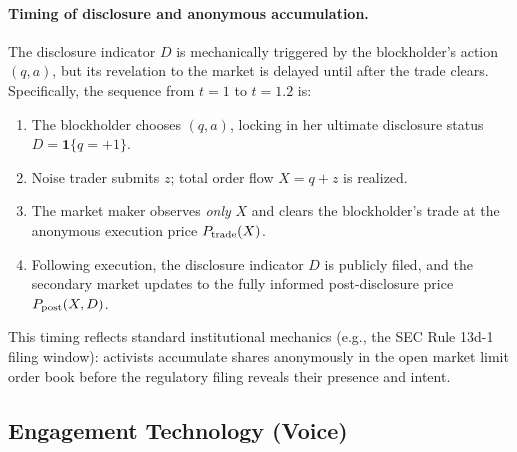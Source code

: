 \documentclass[11pt]{article}
\newcommand{\1}{\mathbf{1}}
\begin{document}
\paragraph{Timing of disclosure and anonymous accumulation.} The disclosure indicator $D$ is mechanically triggered by the blockholder's action $(q, a)$, but its revelation to the market is delayed until after the trade clears. Specifically, the sequence from $t=1$ to $t=1.2$ is:
\begin{enumerate}[label=(\roman*),leftmargin=2em,itemsep=0pt]
\item The blockholder chooses $(q, a)$, locking in her ultimate disclosure status $D = \1\{q=+1\}$.
\item Noise trader submits $z$; total order flow $X = q + z$ is realized.
\item The market maker observes \emph{only} $X$ and clears the blockholder's trade at the anonymous execution price $P_{\textup{trade}}(X)$.
\item Following execution, the disclosure indicator $D$ is publicly filed, and the secondary market updates to the fully informed post-disclosure price $P_{\textup{post}}(X, D)$.
\end{enumerate}
This timing reflects standard institutional mechanics (e.g., the SEC Rule 13d-1 filing window): activists accumulate shares anonymously in the open market limit order book before the regulatory filing reveals their presence and intent.

%
\subsection{Engagement Technology (Voice)}
\label{sec:engagement}
%
\end{document}
